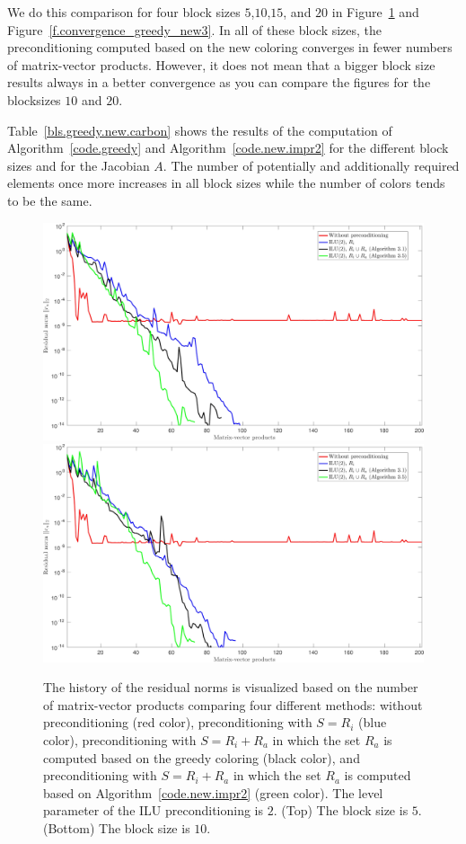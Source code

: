 \documentclass[12pt, twoside,a4paper,toc=bibliography]{scrbook}
\newcommand{\figref}[1]{Figure~\protect\ref{#1}}
\newcommand{\coderef}[1]{Algorithm~\protect\ref{#1}}
\begin{document}
We do this comparison for four block sizes $5$,$10$,$15$, and $20$ in
\figref{f.convergence_greedy_new2} and \figref{f.convergence_greedy_new3}.
In all of these block sizes, the preconditioning computed based
on the new coloring converges in fewer numbers of matrix-vector products.
However, it does not mean that a bigger block size results always in a better convergence
as you can compare the figures for the blocksizes $10$ and $20$.

Table~\ref{bls.greedy.new.carbon} shows the results of the computation of \coderef{code.greedy} and
\coderef{code.new.impr2} for the different block sizes and for the Jacobian $A$.
The number of potentially and additionally required elements once more increases in all block sizes
while the number of colors tends to be the same.

\begin{figure}
\centering
\includegraphics[width=\linewidth]{jac_convergence_greedy_new_5.jpg}
\includegraphics[width=\linewidth]{jac_convergence_greedy_new_10.jpg}
\caption{
The history of the residual norms is visualized based on
the number of matrix-vector products comparing four different methods:
without preconditioning (red color),
preconditioning with $S=R_i$ (blue color),
preconditioning with $S=R_i + R_a$ in which
the set $R_a$ is computed based on the greedy coloring (black color),
and preconditioning with $S=R_i + R_a$ in which
the set $R_a$ is computed based on \coderef{code.new.impr2} (green color).
The level parameter of the ILU preconditioning is $2$.
(Top) The block size is $5$.
(Bottom) The block size is $10$.
}
\label{f.convergence_greedy_new2}
\end{figure}
\end{document}
